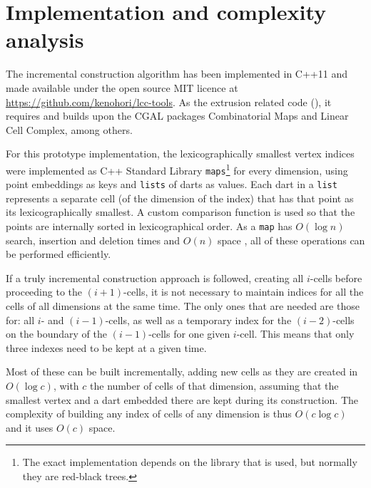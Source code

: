 \section{Implementation and complexity analysis}
\label{se:incremental-implementation}

The incremental construction algorithm has been implemented in C++11 and made available under the open source MIT licence at \url{https://github.com/kenohori/lcc-tools}.
As the extrusion related code (), it requires and builds upon the CGAL packages Combinatorial Maps and Linear Cell Complex, among others.

For this prototype implementation, the lexicographically smallest vertex indices were implemented as C++ Standard Library \texttt{maps}\footnote{The exact implementation depends on the library that is used, but normally they are red-black trees.} for every dimension, using point embeddings as keys and \texttt{lists} of darts as values.
Each dart in a \texttt{list} represents a separate cell (of the dimension of the index) that has that point as its lexicographically smallest.
A custom comparison function is used so that the points are internally sorted in lexicographical order.
As a \texttt{map} has $O(\log n)$ search, insertion and deletion times and $O(n)$ space \citep[\S{}23.4]{ISO14882:2015}, all of these operations can be performed efficiently.

If a truly incremental construction approach is followed, creating all $i$-cells before proceeding to the $(i+1)$-cells, it is not necessary to maintain indices for all the cells of all dimensions at the same time.
The only ones that are needed are those for: all $i$- and $(i-1)$-cells, as well as a temporary index for the $(i-2)$-cells on the boundary of the $(i-1)$-cells for one given $i$-cell.
This means that only three indexes need to be kept at a given time.

Most of these can be built incrementally, adding new cells as they are created in $O(\log c)$, with $c$ the number of cells of that dimension, assuming that the smallest vertex and a dart embedded there are kept during its construction.
The complexity of building any index of cells of any dimension is thus $O(c \log c)$ and it uses $O(c)$ space.

